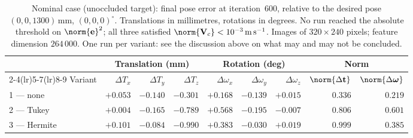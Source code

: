 \begin{table}[t]
    \centering
    \caption{Nominal case (unoccluded target): final pose error at
    iteration~600, relative to the desired pose $(0,0,1300)\,\mathrm{mm}$,
    $(0,0,0)^{\circ}$. Translations in millimetres, rotations in degrees.
    No run reached the absolute threshold on $\norm{\mathbf{e}}^{2}$; all three
    satisfied $\norm{\mathbf{V}_c}<10^{-3}\,\mathrm{m\,s^{-1}}$. Images of
    $320\times240$ pixels; feature dimension $264\,000$. One run per variant:
    see the discussion above on what may and may not be concluded.}
    \label{tab:ch4-nominal}
    \small
    \begin{tabular}{@{}lrrrrrrrr@{}}
        \toprule
        & \multicolumn{3}{c}{Translation (mm)}
        & \multicolumn{3}{c}{Rotation (deg)}
        & \multicolumn{2}{c}{Norm} \\
        \cmidrule(lr){2-4}\cmidrule(lr){5-7}\cmidrule(lr){8-9}
        Variant & $\Delta T_x$ & $\Delta T_y$ & $\Delta T_z$
                & $\Delta\omega_x$ & $\Delta\omega_y$ & $\Delta\omega_z$
                & $\norm{\Delta\mathbf{t}}$ & $\norm{\Delta\boldsymbol{\omega}}$ \\
        \midrule
        1 --- none    & $+0.053$ & $-0.140$ & $-0.301$ & $+0.168$ & $-0.139$ & $+0.015$ & $0.336$ & $0.219$ \\
        2 --- Tukey   & $+0.004$ & $-0.165$ & $-0.789$ & $+0.568$ & $-0.195$ & $-0.007$ & $0.806$ & $0.601$ \\
        3 --- Hermite & $+0.101$ & $-0.084$ & $-0.990$ & $+0.383$ & $-0.030$ & $+0.019$ & $0.999$ & $0.385$ \\
        \bottomrule
    \end{tabular}
\end{table}

